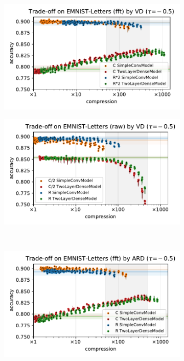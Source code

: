 \documentclass[a4paper,10pt,onecolumn]{article}
\begin{document}
\begin{figure}[b]
\begin{subfigure}[b]{0.5\columnwidth}
  \end{subfigure} \\ %
  \begin{subfigure}[b]{0.5\columnwidth}
    \centering
    \includegraphics[width=\columnwidth]{figure__mnist-like__trade-off/appendix__cmp__VD__emnist_letters__fft__-0.5.pdf}
  \end{subfigure}%
  \begin{subfigure}[b]{0.5\columnwidth}
    \centering
    \includegraphics[width=\columnwidth]{figure__mnist-like__trade-off/appendix__cmp__VD__emnist_letters__raw__-0.5.pdf}
  \end{subfigure} \\ %
  \begin{subfigure}[b]{0.5\columnwidth}
    \centering
    \includegraphics[width=\columnwidth]{figure__mnist-like__trade-off/appendix__ARD__emnist_letters__fft__-0.5.pdf}

\end{subfigure}
\end{figure}
\end{document}
